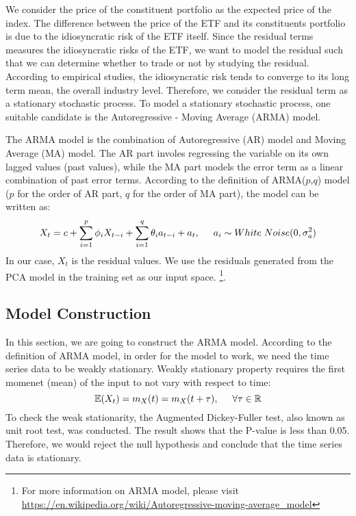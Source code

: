 \documentclass[letterpaper,12pt]{article}
\numberwithin{equation}{section}
\def\R{{\mathbb R}}     %
\def\E{{\mathbb E}}     %
\begin{document}
	We consider the price of the constituent portfolio as the expected price of the index. The difference between the price of the ETF and its constituents portfolio is due to the idiosyncratic risk of the ETF itself. Since the residual terms measures the idiosyncratic risks of the ETF, we want to model the residual such that we can determine whether to trade or not by studying the residual. According to empirical studies, the idiosyncratic risk tends to converge to its long term mean, the overall industry level. Therefore, we consider the residual term as a stationary stochastic process. To model a stationary stochastic process, one suitable candidate is the Autoregressive - Moving Average (ARMA) model. 
	
	The ARMA model is the combination of Autoregressive (AR) model and Moving Average (MA) model. The AR part involes regressing the variable on its own lagged values (past values), while the MA part models the error term as a linear combination of past error terms. According to the definition of ARMA($p$,$q$) model ($p$ for the order of AR part, $q$ for the order of MA part), the model can be written as:
	\begin{equation}\label{ARMA}
	X_t = c + \sum\limits_{i=1}^p \phi_iX_{t-i} + \sum\limits_{i=1}^q \theta_ia_{t-i} + a_t
	,\hspace{0.5cm}a_i \sim  White \hspace{0.1cm}Noise(0,\sigma_a^2) 
	\end{equation}
	In our case, $X_t$ is the residual values. We use the residuals generated from the PCA model in the training set as our input space. \footnote{For more information on ARMA model, please visit \url{https://en.wikipedia.org/wiki/Autoregressive-moving-average_model}}.
	
	\subsection{Model Construction}
	In this section, we are going to construct the ARMA model. According to the definition of ARMA model, in order for the model to work, we need the time series data to be weakly stationary. Weakly stationary property requires the first momenet (mean) of the input to not vary with respect to time:
	\begin{equation}\label{stationary}
	\E(X_t) = m_X(t) = m_X(t+\tau),\hspace{0.5cm} \forall \tau \in \R 
	\end{equation} 
	To check the weak stationarity, the Augmented Dickey-Fuller test, also known as unit root test, was conducted. The result shows that the P-value is less than 0.05. Therefore, we would reject the null hypothesis and conclude that the time series data is stationary. 
	
\end{document}
